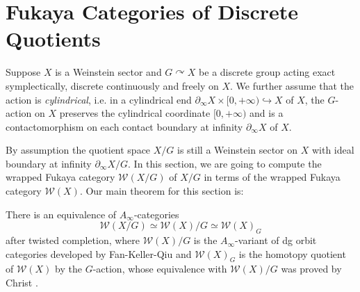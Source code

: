 \section{Fukaya Categories of Discrete Quotients\label{sec:Fukaya-category-discrete-quotient}}
Suppose $X$ is a Weinstein sector and $G\curvearrowright X$ be a discrete group acting exact symplectically, discrete continuously and freely on $X$. We further assume that the action is \emph{cylindrical}, i.e. in a cylindrical end $\partial_{\infty}X\times [0,+\infty)\hookrightarrow X$ of $X$, the $G$-action on $X$ preserves the cylindrical coordinate $[0,+\infty)$ and is a contactomorphism on each contact boundary at infinity $\partial_{\infty} X$ of $X$.\par
By assumption the quotient space $X/G$ is still a Weinstein sector on $X$ with ideal boundary at infinity $\partial_{\infty} X/G$. In this section, we are going to compute the wrapped Fukaya category $\mathcal{W} (X/G)$ of $X/G$ in terms of the wrapped Fukaya category $\mathcal{W} (X)$. Our main theorem for this section is:
\begin{thm}\label{thm:wrapped-Fukaya-quotient}
    There is an equivalence of $A_{\infty}$-categories
    \[
        \mathcal{W} (X/G)\simeq\mathcal{W} (X)/G \simeq\mathcal{W}(X)_G
    \]
    after twisted completion, where $\mathcal{W} (X)/G$ is the $A_{\infty}$-variant of dg orbit categories developed by Fan-Keller-Qiu \cite{FKQ24} and $\mathcal{W}(X)_G$ is the homotopy quotient of $\mathcal{W}(X)$ by the $G$-action, whose equivalence with $\mathcal{W}(X)/G$ was proved by Christ \cite{Christ26}.
\end{thm}

